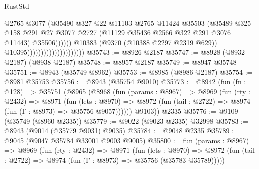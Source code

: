\begin{lexlean}{RustStd}
\begin{coremodule}
{\begin{coremodule}
{{{{{{{{{{{{{{{{{{{{{{{{{{{{{{{{{{{{{{{                                                      @2765
                                                      @3077
                                                      (@35490
                                                        @327
                                                        @22
                                                        @11103
                                                        @2765
                                                        @11424
                                                        @35503
                                                        (@35489
                                                          @325
                                                          @158
                                                          @291
                                                          @27
                                                          @3077
                                                          @2727
                                                          (@11129
                                                            @35436
                                                            @2566
                                                            @322
                                                            @291
                                                            @3076
                                                            @11443)
                                                          @35506))))))
                                              @10383
                                              (@9370 (@10388 @2297 @2319 @629))
                                              @10395)))))))))))))))))))))
@35743 := @8926 @2187
@35747 := @8928 (@8932 @2187) (@8938 @2187)
@35748 := @8957 @2187
@35749 := @8947 @35748
@35751 := @8943 (@35749 @8962)
@35753 := @8985 (@8986 @2187)
@35754 := @8981 @35753
@35756 := @8943 (@35754 @9010)
@35773 := @8942
    (fun (fn : @128) =>
    @35751
      (@8965
        (@8968
          (fun (params : @8967) =>
          @8969
            (fun (rty : @2432) =>
            @8971
              (fun (lets : @8970) =>
              @8972 (fun (tail : @2722) => @8974 (fun (Γ : @8973) => @35756 @9057))))))
        @9103))
    @2335
@35776 := @9109 (@35749 (@8960 @2335))
@35779 := @9022 (@9023 @2335) @32998
@35783 := @8943 (@9014 (@35779 @9031) @9035)
@35784 := @9048 @2335
@35789 := @9045 (@9047 @35784 @33001 @9003 @9005)
@35800 := fun (params : @8967) =>
  @8969
    (fun (rty : @2432) =>
    @8971
      (fun (lets : @8970) =>
      @8972 (fun (tail : @2722) => @8974 (fun (Γ : @8973) => @35756 (@35783 @35789)))))
}}}}}}}}}}}}}}}}}}}}}}}}}}}}}}}}}}}}}}}
\end{coremodule}}
\end{coremodule}
\end{lexlean}
